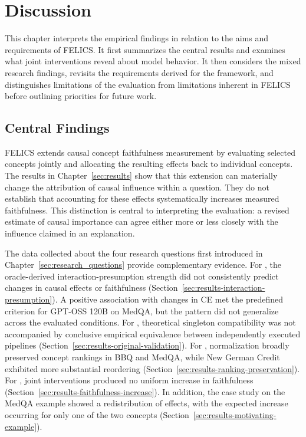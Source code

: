 \chapter{Discussion}
\label{ch:discussion}

This chapter interprets the empirical findings in relation to the aims and requirements of FELICS. It first summarizes the central results and examines what joint interventions reveal about model behavior. It then considers the mixed research findings, revisits the requirements derived for the framework, and distinguishes limitations of the evaluation from limitations inherent in FELICS before outlining priorities for future work.

\section{Central Findings}
\label{sec:central_findings}

FELICS extends causal concept faithfulness measurement by evaluating selected concepts jointly and allocating the resulting effects back to individual concepts. The results in Chapter~\ref{sec:results} show that this extension can materially change the attribution of causal influence within a question. They do not establish that accounting for these effects systematically increases measured faithfulness. This distinction is central to interpreting the evaluation: a revised estimate of causal importance can agree either more or less closely with the influence claimed in an explanation.

The data collected about the four research questions first introduced in Chapter~\ref{sec:research_questions} provide complementary evidence. For , the oracle-derived interaction-presumption strength did not consistently predict changes in causal effects or faithfulness (Section~\ref{sec:results-interaction-presumption}). A positive association with changes in CE met the predefined criterion for GPT-OSS 120B on MedQA, but the pattern did not generalize across the evaluated conditions. For , theoretical singleton compatibility was not accompanied by conclusive empirical equivalence between independently executed pipelines (Section~\ref{sec:results-original-validation}). For , normalization broadly preserved concept rankings in BBQ and MedQA, while New German Credit exhibited more substantial reordering (Section~\ref{sec:results-ranking-preservation}). For , joint interventions produced no uniform increase in faithfulness (Section~\ref{sec:results-faithfulness-increase}). In addition, the case study on the MedQA example showed a redistribution of effects, with the expected increase occurring for only one of the two concepts (Section~\ref{sec:results-motivating-example}).

